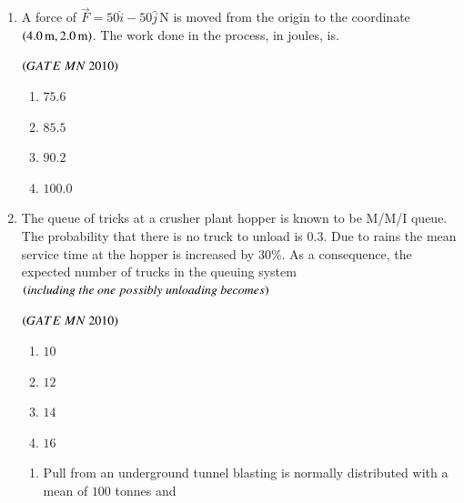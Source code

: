 \documentclass{article}
\begin{document}
\begin{enumerate}[label=Q.\arabic*., itemsep=1em, leftmargin=0pt, itemindent=*, labelsep=0.5em]
\begin{enumerate}[label=Q.\arabic*., start=17, leftmargin=2em]
\begin{multicols}{4}
\begin{enumerate}[label=(\Alph*), leftmargin=4em]
\item $200$
\item $170$
\item $150$
\item $100$
\end{enumerate}
\end{multicols}
\bigskip
\item A force of $\vec{F} = 50\hat{i} - 50\hat{j} \, \text{N}$ is moved from the origin to the coordinate $\left(4.0\,\text{m}, 2.0\,\text{m}\right)$. The work done in the process, in joules, is.
\\
\begin{flushright}
\hfill$\left(GATE\ MN\ 2010\right)$
\end{flushright}
\begin{multicols}{2}
\begin{enumerate}[label=(\Alph*), leftmargin=4em]
\item $75.6$
\item $85.5$
\item $90.2$
\item $100.0$
\end{enumerate}
\end{multicols}
\bigskip
\item The queue of tricks at a crusher plant hopper is known to be M/M/I queue. The probability that
there is no truck to unload is $0.3$.
Due to rains the mean service time at the hopper is increased by $30$\%. As a consequence, the
expected number of trucks in the queuing system $\brak{including\ the\ one\ possibly\ unloading\ becomes}$
\begin{flushright}
\hfill$\left(GATE\ MN\ 2010\right)$
\end{flushright}
\begin{multicols}{4}
\begin{enumerate}[label=(\Alph*), leftmargin=4em]
\item $10$
\item $12$
\item $14$
\item $16$
\end{enumerate}
\end{multicols}
\bigskip
\begin{enumerate}[label=Q.\arabic*., start=33, leftmargin=2em]
\item Pull from an underground tunnel blasting is normally distributed with a mean of $100$ tonnes and

\end{enumerate}
\end{enumerate}
\end{enumerate}
\end{document}
